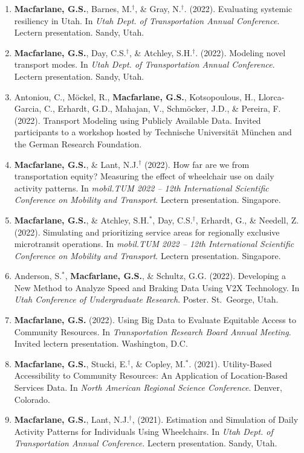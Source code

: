 \documentclass[margin,line]{res}
\newcounter{enuminitialize}
\newenvironment{myenum}[1][]
{%
 \setcounter{enuminitialize}{#1}
 \addtocounter{enuminitialize}{2}
 \begin{enumerate}[left= 4pt, itemsep=12pt, start=\value{enuminitialize}, label=\arabic*\addtocounter{enumi}{-2}]
}
{%
 \end{enumerate}
}
\begin{document}
\begin{resume}
\begin{myenum}[27]
\item \textbf{Macfarlane, G.S.}, Barnes, M.$^\dagger$, \& Gray, N.$^\dagger$. (2022). Evaluating systemic resiliency in Utah. In \textit{Utah Dept. of Transportation Annual Conference}. Lectern presentation. Sandy, Utah.
\item \textbf{Macfarlane, G.S.}, Day, C.S.$^\dagger$, \& Atchley, S.H.$^\dagger$. (2022). Modeling novel transport modes. In \textit{Utah Dept. of Transportation Annual Conference}. Lectern presentation. Sandy, Utah.
\item Antoniou, C., M\"ockel, R., \textbf{Macfarlane, G.S.}, Kotsopoulous, H., Llorca-Garcia, C., Erhardt, G.D., Mahajan, V.,  Schm\"ocker, J.D., \& Pereira, F. (2022). Transport Modeling using Publicly Available Data. Invited participants to a workshop hosted by Technische Universit\"at M\"unchen and the German Research Foundation.
\item \textbf{Macfarlane, G.S.}, \& Lant, N.J.$^\dagger$ (2022). How far are we from transportation equity? Measuring the effect of wheelchair use on daily activity patterns. In \textit{mobil.TUM 2022 – 12th International Scientific Conference on Mobility and Transport}. Lectern presentation. Singapore.
\item \textbf{Macfarlane, G.S.}, \& Atchley, S.H.$^*$, Day, C.S.$^\dagger$, Erhardt, G., \& Needell, Z. (2022). Simulating and prioritizing service areas for regionally exclusive microtransit operations. In \textit{mobil.TUM 2022 – 12th International Scientific Conference on Mobility and Transport}. Lectern presentation. Singapore.
\item Anderson, S.$^*$, \textbf{Macfarlane, G.S.}, \& Schultz, G.G. (2022). Developing a New Method to Analyze Speed and Braking Data Using V2X Technology. In \textit{Utah Conference of Undergraduate Research}. Poster. St.\ George, Utah.
\item \textbf{Macfarlane, G.S.} (2022). Using Big Data to Evaluate Equitable Access to Community Resources. In \textit{Transportation Research Board Annual Meeting}. Invited lectern presentation. Washington, D.C.
\item \textbf{Macfarlane, G.S.}, Stucki,  E.$^\dagger$,  \& Copley, M.$^*$. (2021). Utility-Based Accessibility to Community Resources: An Application of Location-Based Services Data. In \textit{North American Regional Science Conference}. Denver, Colorado.
\item \textbf{Macfarlane, G.S.}, Lant, N.J.$^\dagger$, (2021). Estimation and Simulation of Daily Activity Patterns for Individuals Using Wheelchairs. In \textit{Utah Dept. of Transportation Annual Conference.} Lectern presentation. Sandy, Utah.

\end{myenum}
\end{resume}
\end{document}
